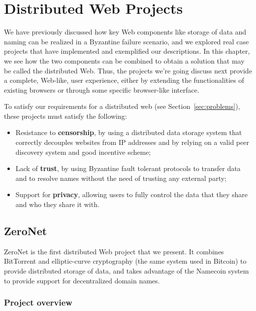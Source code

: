 \documentclass[mscthesis]{usiinfthesis}
\begin{document}
\chapter{Distributed Web Projects}\label{ch:projects}

We have previously discussed how key Web components like storage of data and naming can be realized in a Byzantine failure scenario, and we explored real case projects that have implemented and exemplified our descriptions. In this chapter, we see how the two components can be combined to obtain a solution that may be called the distributed Web.
Thus, the projects we're going discuss next provide a complete, Web-like, user experience, either by extending the functionalities of existing browsers or through some specific browser-like interface.

To satisfy our requirements for a distributed web (see Section~\ref{sec:problems}), these projects must satisfy the following:
\begin{itemize}
	\item Resistance to \textbf{censorship}, by using a distributed data storage system that correctly decouples websites from IP addresses and by relying on a valid peer discovery system and good incentive scheme;
	\item Lack of \textbf{trust}, by using Byzantine fault tolerant protocols to transfer data and to resolve names without the need of trusting any external party;
	\item Support for \textbf{privacy}, allowing users to fully control the data that they share and who they share it with.
\end{itemize}

\section{ZeroNet}\label{proj:zeronet}

ZeroNet is the first distributed Web project that we present. It combines BitTorrent and elliptic-curve cryptography (the same system used in Bitcoin) to provide distributed storage of data, and takes advantage of the Namecoin system to provide support for decentralized domain names.

\subsection{Project overview}
\end{document}
